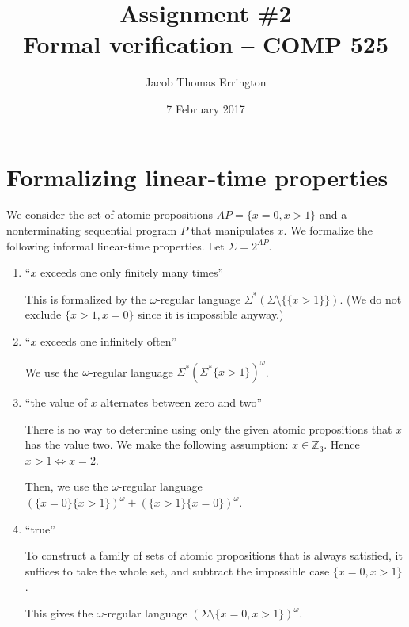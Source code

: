 \documentclass[letterpaper,11pt]{article}
\author{Jacob Thomas Errington}
\title{Assignment \#2\\Formal verification -- COMP 525}
\date{7 February 2017}
\newcommand{\Z}{\mathbb{Z}}
\begin{document}
\maketitle

\section{Formalizing linear-time properties}

We consider the set of atomic propositions $AP = \{x = 0, x > 1\}$ and a
nonterminating sequential program $P$ that manipulates $x$. We formalize the
following informal linear-time properties. Let $\Sigma = 2^{AP}$.

\begin{enumerate}
        \renewcommand{\labelenumi}{(\alph{enumi})}
        \setcounter{enumi}{4}
    \item ``$x$ exceeds one only finitely many times''

        This is formalized by the $\omega$-regular language
        $\Sigma^* (\Sigma \setminus \{ \{x>1\} \})$.
        (We do not exclude $\{x>1, x=0\}$ since it is impossible anyway.)

    \item ``$x$ exceeds one infinitely often''

        We use the $\omega$-regular language
        $\Sigma^* (\Sigma^* \{x>1\})^\omega$.

    \item ``the value of $x$ alternates between zero and two''

        There is no way to determine using only the given atomic propositions
        that $x$ has the value two. We make the following assumption:
        $x \in \Z_3$. Hence $x > 1 \iff x = 2$.

        Then, we use the $\omega$-regular language
        $(\{x=0\}\{x>1\})^\omega + (\{x>1\}\{x=0\})^\omega$.

    \item ``true''

        To construct a family of sets of atomic propositions that is always
        satisfied, it suffices to take the whole set, and subtract the
        impossible case $\{x=0, x>1\}$.

        This gives the $\omega$-regular language
        $(\Sigma \setminus \{x=0, x>1\})^\omega$.
\end{enumerate}
\end{document}
